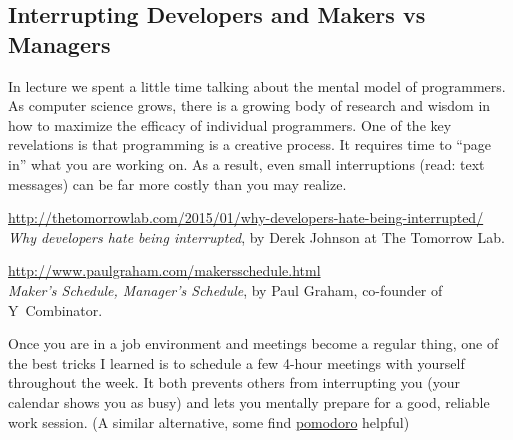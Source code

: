\documentclass{article}
\begin{document}
{\small

\subsection*{Interrupting Developers and Makers vs Managers}
In lecture we spent a little time talking about the mental model of
programmers. As computer science grows, there is a growing body of research
and wisdom in how to maximize the efficacy of individual programmers.
One of the key revelations is that programming is a creative process. It
requires time to ``page in'' what you are working on. As a result, even small
interruptions (read: text messages) can be far more costly than you may
realize.

\medskip
\noindent
\url{http://thetomorrowlab.com/2015/01/why-developers-hate-being-interrupted/}\\
\emph{Why developers hate being interrupted}, by Derek Johnson at The Tomorrow Lab.

\noindent
\url{http://www.paulgraham.com/makersschedule.html}\\
\emph{Maker's Schedule, Manager's Schedule}, by Paul Graham, co-founder of Y~Combinator.

\medskip
\noindent
Once you are in a job environment and meetings become a regular thing, one of
the best tricks I learned is to schedule a few 4-hour meetings with yourself
throughout the week. It both prevents others from interrupting you (your
calendar shows you as busy) and lets you mentally prepare for a good, reliable
work session.
(A similar alternative, some find
\href{http://lifehacker.com/productivity-101-a-primer-to-the-pomodoro-technique-1598992730}{pomodoro}
helpful)


}
\end{document}
